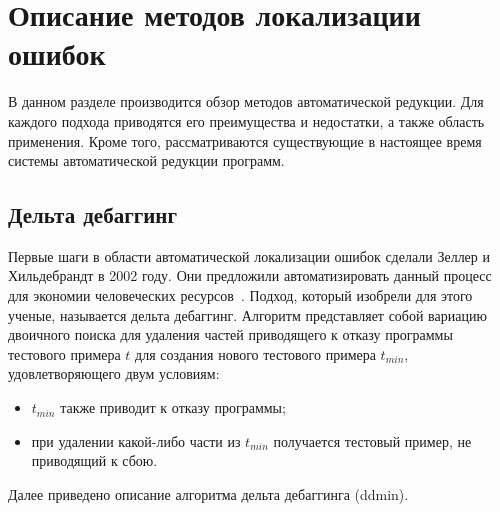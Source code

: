 \chapter{Описание методов локализации ошибок}\label{analysis}
В данном разделе производится обзор методов автоматической редукции. Для каждого подхода приводятся его преимущества и недостатки, а также область применения. Кроме того, рассматриваются существующие в настоящее время системы автоматической редукции программ.

\section{Дельта дебаггинг}\label{ddalg}
Первые шаги в области автоматической локализации ошибок сделали Зеллер и Хильдебрандт в 2002 году. Они предложили автоматизировать данный процесс для экономии человеческих ресурсов~\cite{zeller2002simplifying}. Подход, который изобрели для этого ученые, называется дельта дебаггинг. Алгоритм представляет собой вариацию двоичного поиска для удаления частей приводящего к отказу программы тестового примера $t$ для создания нового тестового примера $t_{min}$, удовлетворяющего двум условиям:
\begin{itemize}
\item $t_{min}$ также приводит к отказу программы;
\item при удалении какой-либо части из $t_{min}$ получается тестовый пример, не приводящий к сбою.
\end{itemize}
Далее приведено описание алгоритма дельта дебаггинга (ddmin).

